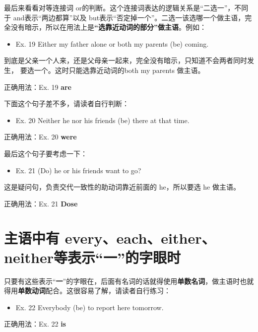 \documentclass{yufa}
\begin{document}
最后来看看对等连接词 or的判断。这个连接词表达的逻辑关系是“二选一”，不同
于 and表示“两边都算”以及 but表示“否定掉一个”。二选一该选哪一个做主语，完
全没有暗示，所以在用法上是\textbf{“选靠近动词的部分”做主语}。例如：

\begin{mybox}

  \begin{itemize}
  \item   Ex. 19 Either my father alone or both my parents (be) coming.
  \end{itemize}

  到底是父亲一个人来，还是父母亲一起来，完全没有暗示，只知道不会两者同时发生，
  要选一个。这时只能选靠近动词的both my parents 做主语。

  \tcblower

  正确用法：Ex. 19 \textbf{are}
\end{mybox}

下面这个句子差不多，请读者自行判断：
\begin{mybox}
  \begin{itemize}
  \item   Ex. 20 Neither he nor his friends (be) there at that time.
  \end{itemize}

  \tcblower

  正确用法：Ex. 20 \textbf{were}
\end{mybox}

最后这个句子要考虑一下：

\begin{mybox}
  \begin{itemize}
  \item   Ex. 21 (Do) he or his friends want to go?
  \end{itemize}

  这是疑问句，负责交代一致性的助动词靠近前面的 he，所以要选 he 做主语。

  \tcblower

  正确用法：Ex. 21 \textbf{Dose}
\end{mybox}

\section{主语中有 every、each、either、neither等表示“一”的字眼时}

只要有这些表示“\textbf{一}”的字眼在，后面有名词的话就得使用\textbf{单数名词}，做主语时也就得用\textbf{单数动词}配合。这很容易了解，请读者自行练习：
\begin{mybox}

  \begin{itemize}
  \item   Ex. 22 Everybody (be) to report here tomorrow.
  \end{itemize}

  \tcblower

  正确用法：Ex. 22 \textbf{is}
\end{mybox}
\end{document}
